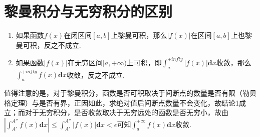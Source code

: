 \section{黎曼积分与无穷积分的区别}

\begin{proposition}
	\begin{enumerate}
		\item 	如果函数$f(x)$在闭区间$[a,b]$上黎曼可积，那么$|f(x)|$在区间$[a,b]$上也黎曼可积，反之不成立.
		\item 	如果函数$|f(x)|$在无穷区间$[a,+\infty)$上可积，即$\int_{a}^{+infty}|f(x)|\textbf{d}x$收敛，那么$\int_{a}^{+infty}f(x)\textbf{d}x$收敛，反之不成立.
	\end{enumerate}

\end{proposition}

值得注意的是，对于黎曼积分，函数是否可积取决于间断点的数量是否有限（勒贝格定理）与是否有界，正因如此，求绝对值后间断点数量不会变化，故结论1成立；而对于无穷积分，是否收敛取决于无穷远处的函数是否无穷小，故由$|\int_{A'}^{A''}f(x)\textbf{d}x|\leq \int_{A'}^{A''}|f(x)|\textbf{d}x<\epsilon$可知$\int_{a}^{+\infty}f(x)\textbf{d}x$收敛.